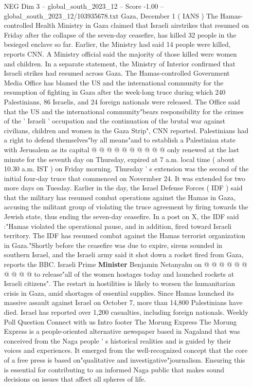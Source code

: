 \begin{textsample}{NEG Dim 3 – global\_south\_2023\_12 – Score -1.00 – global\_south\_2023\_12/103935678.txt}  \label{ex:f3_neg_031}
Gaza, December 1 ( IANS ) The Hamas-controlled Health Ministry in Gaza claimed that Israeli airstrikes that resumed on Friday after the collapse of the seven-day ceasefire, has killed 32 people in the besieged enclave so far.
Earlier, the Ministry had said 14 people were killed, reports CNN.
A Ministry official said the majority of those killed were women and children.
In a separate statement, the Ministry of Interior confirmed that Israeli strikes had resumed across Gaza.
The Hamas-controlled Government Media Office has blamed the US and the international community for the resumption of fighting in Gaza after the week-long truce during which 240 Palestinians, 86 Israelis, and 24 foreign nationals were released.
The Office said that the US and the international community"bears responsibility for the crimes of the ' Israeli ' occupation and the continuation of the brutal war against civilians, children and women in the Gaza Strip", CNN reported.
Palestinians had a right to defend themselves"by all means"and to establish a Palestinian state with Jerusalem as its capital @ @ @ @ @ @ @ @ @ @ only renewed at the last minute for the seventh day on Thursday, expired at 7 a.m. local time ( about 10.30 a.m.
IST ) on Friday morning.
Thursday ' s extension was the second of the initial four-day truce that commenced on Novermber 24.
It was extended for two more days on Tuesday.
Earlier in the day, the Israel Defense Forces ( IDF ) said that the military has resumed combat operations against the Hamas in Gaza, accusing the militant group of violating the truce agreement by firing towards the Jewish state, thus ending the seven-day ceasefire.
In a post on X, the IDF said :"Hamas violated the operational pause, and in addition, fired toward Israeli territory.
The IDF has resumed combat against the Hamas terrorist organization in Gaza."Shortly before the ceasefire was due to expire, sirens sounded in southern Israel, and the Israeli army said it shot down a rocket fired from Gaza, reports the BBC.
Israeli Prime \textbf{Minister} Benjamin Netanyahu on @ @ @ @ @ @ @ @ @ @ to release"all of the women hostages today and launched rockets at Israeli citizens".
The restart in hostilities is likely to worsen the humanitarian crisis in Gaza, amid shortages of essential supplies.
Since Hamas launched its massive assault against Israel on October 7, more than 14,800 Palestinians have died.
Israel has reported over 1,200 casualties, including foreign nationals.
Weekly Poll Question Connect with us Intro footer The Morung Express The Morung Express is a people-oriented alternative newspaper based in Nagaland that was conceived from the Naga people ' s historical realities and is guided by their voices and experiences.
It emerged from the well-recognized concept that the core of a free press is based on"qualitative and investigative"journalism.
Ensuring this is essential for contributing to an informed Naga public that makes sound decisions on issues that affect all spheres of life.

\end{textsample}
